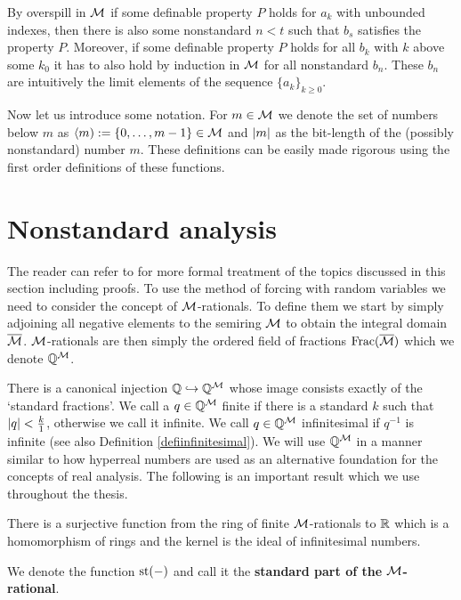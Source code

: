 By overspill in $\mathcal{M}$ if some definable property $P$ holds for $a_k$ with unbounded indexes, then there is also some nonstandard $n<t$ such that $b_s$ satisfies the property $P$. Moreover, if some definable property $P$ holds for all $b_k$ with $k$ above some $k_0$ it has to also hold by induction in $\mathcal{M}$ for all nonstandard $b_n$. These $b_n$ are intuitively the limit elements of the sequence $\{a_k\}_{k\geq0}$.

Now let us introduce some notation. For $m\in\mathcal{M}$ we denote the set of numbers below $m$ as $\langle m):=\{0,\dots,m-1\}\in\mathcal{M}$ and $\left|{m}\right|$ as the bit-length of the (possibly nonstandard) number $m$. These definitions can be easily made rigorous using the first order definitions of these functions.

\section*{Nonstandard analysis}

The reader can refer to \cite{goldbring2014lecture} for more formal treatment of the topics discussed in this section including proofs. To use the method of forcing with random variables we need to consider the concept of $\mathcal{M}$-rationals. To define them we start by simply adjoining all negative elements to the semiring $\mathcal{M}$ to obtain the integral domain $\overline {\mathcal{M}}$. $\mathcal{M}$-rationals are then simply the ordered field of fractions $\text{Frac}(\overline {\mathcal{M}})$ which we denote $\mathbb{Q}^{\mathcal{M}}$.

There is a canonical injection $\mathbb{Q} \hookrightarrow \mathbb{Q}^{\mathcal{M}}$ whose image consists exactly of the `standard fractions'. We call a $q\in\mathbb{Q}^{\mathcal{M}}$ finite if there is a standard $k$ such that $\left|{q}\right|<\frac{k}{1}$, otherwise we call it infinite. We call $q\in\mathbb{Q}^{\mathcal{M}}$ infinitesimal if $q^{-1}$ is infinite (see also Definition \ref{defiinfinitesimal}). We will use $\mathbb{Q}^{\mathcal{M}}$ in a manner similar to how hyperreal numbers are used as an alternative foundation for the concepts of real analysis. The following is an important result which we use throughout the thesis.

\begin{thrm*}
There is a surjective function from the ring of finite $\mathcal{M}$-rationals to $\mathbb{R}$ which is a homomorphism of rings and the kernel is the ideal of infinitesimal numbers.

We denote the function $\text{st}(-)$ and call it the \textbf{standard part of the $\mathcal{M}$-rational}.
\end{thrm*}


